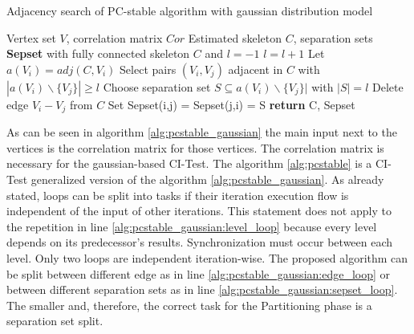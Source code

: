 \begin{algorithm}
    \caption{Adjacency search of PC-stable algorithm with gaussian distribution model \cite{schmidtOrderIndependentConstraintBasedCausal2018, colomboOrderIndependentConstraintBasedCausal}}
    \label{alg:pcstable_gaussian}
    \begin{algorithmic}[1]
    \Require Vertex set $V$, correlation matrix $Cor$
    \Ensure Estimated skeleton $C$, separation sets \textbf{Sepset}
    \State with fully connected skeleton $C$ and $l = -1$
    \Repeat \label{alg:pcstable_gaussian:level_loop}
        \State $l=l+1$
            \State Let $a(V_i) = adj(C,V_i)$
        \EndFor
        \Repeat \label{alg:pcstable_gaussian:edge_loop}
            \State Select pairs $(V_i,V_j)$ adjacent in $C$ with $|a(V_i)\backslash\{V_j\}| \geq l$
            \Repeat \label{alg:pcstable_gaussian:sepset_loop}
                \State Choose separation set $S \subseteq a(V_i ) \backslash \{V_j\}|$ with $| S | = l$
                    \State Delete edge $V_i - V_j$ from $C$
                    \State Set Sepset(i,j) = Sepset(j,i) = S
                \EndIf
    \State \textbf{return} C, Sepset
    \end{algorithmic}
\end{algorithm}

As can be seen in algorithm \ref{alg:pcstable_gaussian} the main input next to the vertices is the correlation matrix for those vertices. The correlation matrix is necessary for the gaussian-based CI-Test. The algorithm \ref{alg:pcstable} is a CI-Test generalized version of the algorithm \ref{alg:pcstable_gaussian}.
As already stated, loops can be split into tasks if their iteration execution flow is independent of the input of other iterations. This statement does not apply to the repetition in line \ref{alg:pcstable_gaussian:level_loop} because every level depends on its predecessor's results. Synchronization must occur between each level.
Only two loops are independent iteration-wise. The proposed algorithm can be split between different edge as in line \ref{alg:pcstable_gaussian:edge_loop} or between different separation sets as in line \ref{alg:pcstable_gaussian:sepset_loop}. The smaller and, therefore, the correct task for the Partitioning phase is a separation set split.

